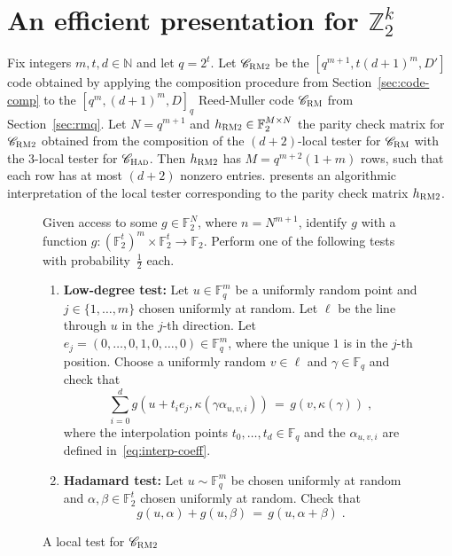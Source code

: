 \documentclass[11pt]{article}
\theoremstyle{definition}
\newcommand{\code}{\mathscr{C}}
\newcommand{\N}{\ensuremath{\mathbb{N}}}
\newcommand{\F}{\ensuremath{\mathbb{F}}}
\newcommand{\Z}{\ensuremath{\mathbb{Z}}}
\newcommand{\RM}{\ensuremath{\textsc{RM}}}
\newcommand{\bRM}{\ensuremath{\textsc{RM2}}}
\newcommand{\had}{\textsc{Had}}
\newenvironment{gamespec}{
  \begin{mdframed}[style=figstyle]}{
  \end{mdframed}}
\begin{document}
\section{An efficient presentation for $\Z_2^k$}
\label{sec:eff-z2k}

Fix integers $m,t,d \in \N$ and let $q=2^t$. Let $\code_{\bRM}$ be the $[q^{m+1},t(d+1)^m,D']$ code obtained by applying the composition procedure from Section~\ref{sec:code-comp} to the $[q^m,(d+1)^m,D]_q$ Reed-Muller code $\code_\RM$ from Section~\ref{sec:rmq}. Let $N=q^{m+1}$ and $h_{\bRM}\in \F_2^{M\times N}$ the parity check matrix for $\code_{\bRM}$ obtained from the composition of the $(d+2)$-local tester for $\code_\RM$ with the $3$-local tester for $\code_\had$. Then $h_\bRM$ has $M=  q^{m+2}(1+m)$ rows, such that each row has at most $(d+2)$ nonzero entries. 
 presents an algorithmic interpretation of the local tester corresponding to the parity check matrix $h_{\bRM}$. 


\begin{figure}[!htbp]
  \centering
  \begin{gamespec}
Given access to some $g\in \F_2^{N}$, where $n=N^{m+1}$, identify $g$ with a function $g:(\F_2^t)^m \times \F_2^t \to \F_2$. Perform one of the following tests with probability~$\tfrac{1}{2}$ each. 
\begin{enumerate}
	\item \textbf{Low-degree test:}
		Let $u \in \F_q^m$ be a uniformly random point and $j\in \{1,\ldots,m\}$ chosen uniformly at random. Let $\ell$ be the line through $u$ in the $j$-th direction. Let $e_j=(0,\ldots,0,1,0,\ldots,0)\in \F_q^m$, where the unique $1$ is in the $j$-th position. Choose a uniformly random $v\in \ell$ and $\gamma\in \F_q$ and check that 
		\[\sum_{i=0}^d g(u+t_i e_j,\kappa(\gamma \alpha_{u,v,i})) \,=\, g(v,\kappa(\gamma))\;,\]
		where the interpolation points $t_0,\ldots,t_d \in \F_q$ and the $\alpha_{u,v,i}$ are defined in~\eqref{eq:interp-coeff}.
	\item \textbf{Hadamard test:} Let $u\sim\F_q^m$ be chosen uniformly at random and $\alpha,\beta\in \F_2^t$ chosen uniformly at random. Check that 
	\[g(u,\alpha)+g(u,\beta)\,=\,g(u,\alpha+\beta)\;.\] 	
    \end{enumerate}
  \end{gamespec}
  \caption{A local test for $\code_{\bRM}$}
  \label{fig:bRM-tester}
\end{figure}
\end{document}
